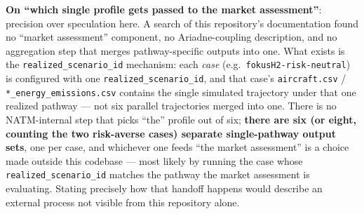 \documentclass{article}
\begin{document}
\textbf{On ``which single profile gets passed to the market
assessment''}: precision over speculation here. A search of this
repository's documentation found no ``market assessment'' component, no
Ariadne-coupling description, and no aggregation step that merges
pathway-specific outputs into one. What exists is the
\verb|realized_scenario_id| mechanism: each \emph{case} (e.g.\
\texttt{fokusH2-risk-neutral}) is configured with one
\verb|realized_scenario_id|, and that case's \texttt{aircraft.csv} /
\texttt{*\_energy\_emissions.csv} contains the single simulated trajectory
under that one realized pathway --- not six parallel trajectories merged
into one. There is no NATM-internal step that picks ``the'' profile out of
six; \textbf{there are six (or eight, counting the two risk-averse cases)
separate single-pathway output sets}, one per case, and whichever one feeds
``the market assessment'' is a choice made outside this codebase --- most
likely by running the case whose \verb|realized_scenario_id| matches the
pathway the market assessment is evaluating. Stating precisely how that
handoff happens would describe an external process not visible from this
repository alone.
\end{document}
